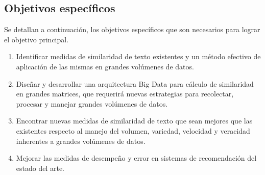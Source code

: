 \subsection{Objetivos específicos}
\noindent Se detallan a continuación, los objetivos específicos que son necesarios para lograr el objetivo principal.
\begin{enumerate}
	\item Identificar medidas de similaridad de texto existentes y un método efectivo de aplicación de las mismas en grandes volúmenes de datos.
	\item Diseñar y desarrollar una arquitectura Big Data para cálculo de similaridad en grandes matrices, que requerirá nuevas estrategias para recolectar, procesar y manejar grandes volúmenes de datos.
	\item Encontrar nuevas medidas de similaridad de texto que sean mejores que las existentes respecto al manejo del volumen, variedad, velocidad y veracidad inherentes a grandes volúmenes de datos.
	\item Mejorar las medidas de desempeño y error en sistemas de recomendación del estado del arte.
\end{enumerate}